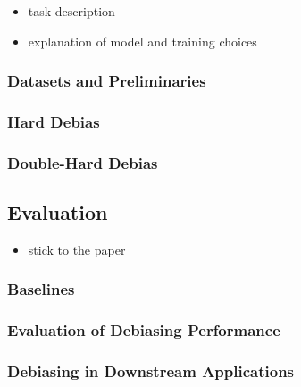 \documentclass[
  english,
  man]{apa6}
\providecommand{\tightlist}{%
  \setlength{\itemsep}{0pt}\setlength{\parskip}{0pt}}
\begin{document}
\begin{itemize}
\tightlist
\item
  task description
\item
  explanation of model and training choices
\end{itemize}

\hypertarget{datasets-and-preliminaries}{%
\subsubsection{Datasets and Preliminaries}\label{datasets-and-preliminaries}}

\hypertarget{hard-debias}{%
\subsubsection{Hard Debias}\label{hard-debias}}

\hypertarget{double-hard-debias}{%
\subsubsection{Double-Hard Debias}\label{double-hard-debias}}

\hypertarget{evaluation}{%
\subsection{Evaluation}\label{evaluation}}

\begin{itemize}
\tightlist
\item
  stick to the paper
\end{itemize}

\hypertarget{baselines}{%
\subsubsection{Baselines}\label{baselines}}

\hypertarget{evaluation-of-debiasing-performance}{%
\subsubsection{Evaluation of Debiasing Performance}\label{evaluation-of-debiasing-performance}}

\hypertarget{debiasing-in-downstream-applications}{%
\subsubsection{Debiasing in Downstream Applications}\label{debiasing-in-downstream-applications}}
\end{document}
